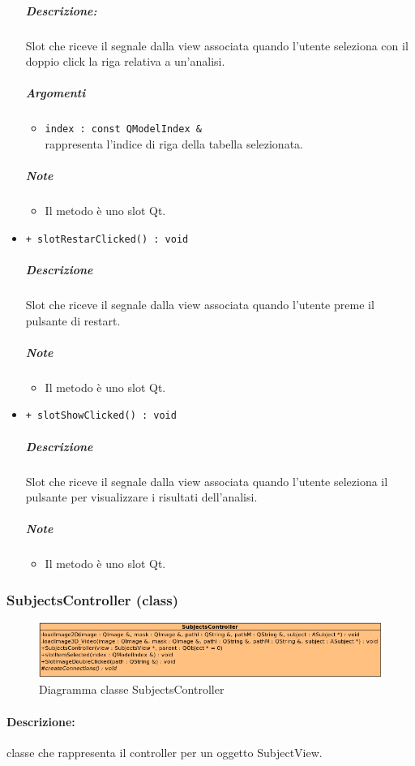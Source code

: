 \begin{itemize}
			\color{black}
			\subparagraph{Descrizione:} Slot\g{} che riceve il segnale dalla view associata quando l'utente seleziona con il doppio click la riga relativa a un'analisi.
			\color{black}
			\subparagraph{Argomenti}
			\begin{itemize}
				\item \color{RoyalPurple} \verb!index : const QModelIndex &!\\				
\color{black} rappresenta l'indice di riga della tabella selezionata.
			\end{itemize}
			\subparagraph{Note}
			\begin{itemize}
				\item Il metodo è uno slot\g{} Qt\g{}.
			\end{itemize}
			\item \color{blue} \verb!+ slotRestarClicked() : void!
			\color{black}
			\subparagraph{Descrizione} Slot\g{} che riceve il segnale dalla view associata quando l'utente preme il pulsante di restart.
			\subparagraph{Note}
			\begin{itemize}
				\item Il metodo è uno slot\g{} Qt\g{}.
			\end{itemize}
			\item \color{blue} \verb!+ slotShowClicked() : void!
			\color{black}
			\subparagraph{Descrizione} Slot\g{} che riceve il segnale dalla view associata quando l'utente seleziona il pulsante per visualizzare i risultati dell'analisi.
			\subparagraph{Note}
			\begin{itemize}
				\item Il metodo è uno slot\g{} Qt\g{}.
			\end{itemize}
		\end{itemize}
		\pagebreak
	\subsubsection{SubjectsController (class)}
	\begin{figure}[!h]
		\centering
		\includegraphics[width=\linewidth]{./Content/Immagini/controller/SubjectsController.png}
		\caption{Diagramma classe SubjectsController}
	\end{figure}
	\paragraph{Descrizione:} classe che rappresenta il controller per un oggetto SubjectView.

